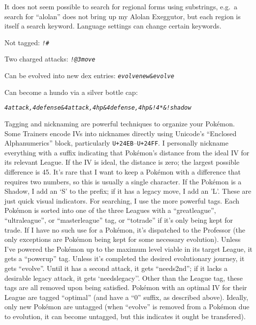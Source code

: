 It does not seem possible to search for regional forms using substrings,
 e.g.\ a search for ``alolan'' does not bring up my Alolan Exeggutor,
 but each region is itself a search keyword.
Language settings can change certain keywords.
\begin{tipbox}[title=Some useful search strings]
\footnotesize
\raggedright
Not tagged: \textit{\texttt{!\#}}

Two charged attacks: \textit{\texttt{!@3move}}

Can be evolved into new dex entries: \textit{\texttt{evolvenew\&evolve}}

Can become a hundo via a silver bottle cap:

\textit{\texttt{4attack,4defense\&4attack,4hp\&4defense,4hp\&!4*\&!shadow}}
\end{tipbox}
Tagging and nicknaming are powerful techniques to organize your Pokémon.
Some Trainers encode IVs into nicknames directly using Unicode's ``Enclosed Alphanumerics'' block,
 particularly \texttt{U+24EB}--\texttt{U+24FF}.
I personally nickname everything with a suffix indicating that Pokémon's distance from the ideal IV for its relevant League.
If the IV is ideal, the distance is zero; the largest possible difference is 45.
It's rare that I want to keep a Pokémon with a difference that requires two numbers,
 so this is usually a single character.
If the Pokémon is a Shadow, I add an `S' to the prefix; if it has a legacy move, I add an 'L'.
These are just quick visual indicators.
For searching, I use the more powerful tags.
Each Pokémon is sorted into one of the three Leagues with a ``greatleague'', ``ultraleague'',
 or ``masterleague'' tag, or ``totrade'' if it's only being kept for trade.
If I have no such use for a Pokémon, it's dispatched to the Professor (the only exceptions are Pokémon being kept for some necessary evolution).
Unless I've powered the Pokémon up to the maximum level viable in its target League, it
 gets a ``powerup'' tag.
Unless it's completed the desired evolutionary journey, it gets ``evolve''.
Until it has a second attack, it gets ``needs2nd''; if it lacks a desirable legacy attack, it gets `needslegacy''.
Other than the League tag, these tags are all removed upon being satisfied.
Pokémon with an optimal IV for their League are tagged ``optimal'' (and have a ``0'' suffix, as described above).
Ideally, only new Pokémon are untagged (when ``evolve'' is removed from a Pokémon due to
 evolution, it can become untagged, but this indicates it ought be transfered).

